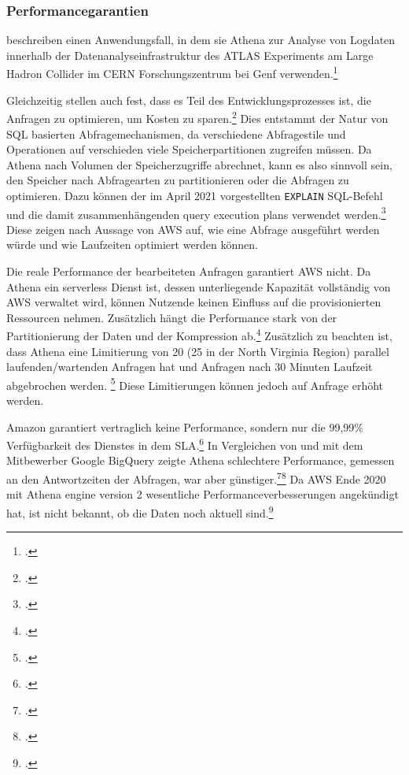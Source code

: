 \subsubsection{Performancegarantien}

\citeauthor{Hartland.2018} beschreiben einen Anwendungsfall, in dem sie Athena zur Analyse von Logdaten innerhalb der Datenanalyseinfrastruktur des ATLAS Experiments am Large Hadron Collider im CERN Forschungszentrum bei Genf verwenden.\footcite[Vgl.][]{Hartland.2018}

Gleichzeitig stellen \citeauthor{Hartland.2018} auch fest, dass es Teil des Entwicklungsprozesses ist, die Anfragen zu  optimieren, um Kosten zu sparen.\footcite[Vgl.][5]{Hartland.2018} Dies entstammt der Natur von \ac{SQL} basierten Abfragemechanismen, da verschiedene Abfragestile und Operationen auf verschieden viele Speicherpartitionen zugreifen müssen. Da Athena nach Volumen der Speicherzugriffe abrechnet, kann es also sinnvoll sein, den Speicher nach Abfragearten zu partitionieren oder die Abfragen zu optimieren. Dazu können der im April 2021 vorgestellten \texttt{EXPLAIN} \ac{SQL}-Befehl und die damit zusammenhängenden query execution plans verwendet werden.\footcite[Vgl. auch im Folgenden][]{AmazonWebServicesInc..2021} Diese zeigen nach Aussage von \ac{AWS} auf, wie eine Abfrage ausgeführt werden würde und wie Laufzeiten optimiert werden können.

Die reale Performance der bearbeiteten Anfragen garantiert \ac{AWS} nicht. Da Athena ein serverless Dienst ist, dessen unterliegende Kapazität vollständig von \ac{AWS} verwaltet wird, können Nutzende keinen Einfluss auf die provisionierten Ressourcen nehmen. Zusätzlich hängt die Performance stark von der Partitionierung der Daten und der Kompression ab.\footcite[Vgl.][]{Levy.2021} Zusätzlich zu beachten ist, dass Athena eine Limitierung von 20 (25 in der North Virginia Region) parallel laufenden/wartenden Anfragen hat und Anfragen nach 30 Minuten Laufzeit abgebrochen werden. \footcite[Vgl. auch im Folgenden][]{AmazonWebServicesInc..o.J.ac} Diese Limitierungen können jedoch auf Anfrage erhöht werden.

Amazon garantiert vertraglich keine Performance, sondern nur die 99,99\% Verfügbarkeit des Dienstes in dem \ac{SLA}.\footcite[Vgl.][]{AmazonWebServicesInc..2019c} In Vergleichen von \citeauthor{Levy.2019} und \citeauthor{Khadtare.2018} mit dem Mitbewerber Google BigQuery zeigte Athena schlechtere Performance, gemessen an den Antwortzeiten der Abfragen, war aber günstiger.\footcite[Vgl.][]{Levy.2019}\nzitat\footcite[Vgl.][]{Khadtare.2018} Da \ac{AWS} Ende 2020 mit Athena engine version 2 wesentliche Performanceverbesserungen angekündigt hat, ist nicht bekannt, ob die Daten noch aktuell sind.\footcite[Vgl.][]{AmazonWebServicesInc..2020c}

